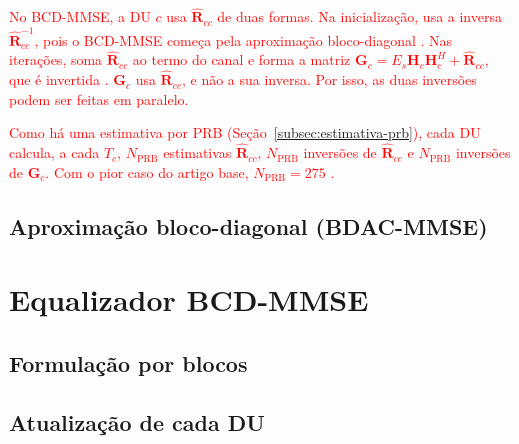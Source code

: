 \textcolor{red}{No BCD-MMSE, a DU $c$ usa $\hat{\mathbf{R}}_{cc}$ de duas formas. Na inicialização, usa a inversa $\hat{\mathbf{R}}_{cc}^{-1}$, pois o BCD-MMSE começa pela aproximação bloco-diagonal \cite{zhao2025jsac}. Nas iterações, soma $\hat{\mathbf{R}}_{cc}$ ao termo do canal e forma a matriz $\mathbf{G}_c = E_s\mathbf{H}_c\mathbf{H}_c^H + \hat{\mathbf{R}}_{cc}$, que é invertida \cite{zhao2025jsac}. $\mathbf{G}_c$ usa $\hat{\mathbf{R}}_{cc}$, e não a sua inversa. Por isso, as duas inversões podem ser feitas em paralelo.}

\textcolor{red}{Como há uma estimativa por PRB (Seção~{\hypersetup{linkcolor=red}\ref{subsec:estimativa-prb}}), cada DU calcula, a cada $T_c$, $N_{\text{PRB}}$ estimativas $\hat{\mathbf{R}}_{cc}$, $N_{\text{PRB}}$ inversões de $\hat{\mathbf{R}}_{cc}$ e $N_{\text{PRB}}$ inversões de $\mathbf{G}_c$. Com o pior caso do artigo base, $N_{\text{PRB}} = 275$ \cite{zhao2025jsac}.}


\subsection{Aproximação bloco-diagonal (BDAC-MMSE)}

\section{Equalizador BCD-MMSE}\label{sec:bcd}

\subsection{Formulação por blocos}

\subsection{Atualização de cada DU}

